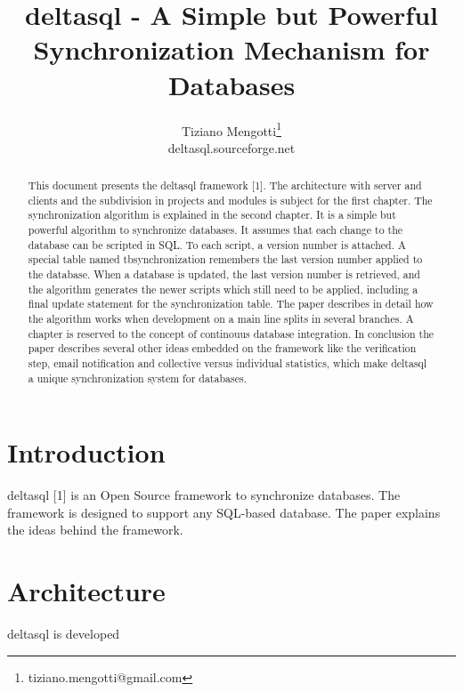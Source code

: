 \documentclass[10pt,a4paper]{article}
\begin{document}
\pagestyle{headings}

\title{deltasql - A Simple but Powerful Synchronization Mechanism for Databases}

\author{Tiziano Mengotti\thanks{tiziano.mengotti@gmail.com}\\
deltasql.sourceforge.net\\}

\maketitle
\thispagestyle{empty}

\begin{abstract}
This document presents the deltasql framework [1]. The architecture with server and clients and the subdivision in projects and modules is subject for the first chapter. 
The synchronization algorithm is explained in the second chapter. It is a simple but powerful algorithm to synchronize databases. It assumes that each change to the database can be scripted in SQL. To each script, a version number is attached. A special table named tbsynchronization remembers the last version number applied to the database. When a database is updated, the last version number is retrieved, and the algorithm generates the newer scripts which still need to be applied, including a final update statement for the synchronization table. The paper describes in detail how the algorithm works when development on a main line splits in several branches. 
A chapter is reserved to the concept of continouus database integration. In conclusion the paper describes several other ideas embedded on the framework like the verification step, email notification and collective versus individual statistics, which make deltasql a unique synchronization system for databases. 
\end{abstract}

\section{Introduction}
\label{sec:intro}
deltasql [1] is an Open Source framework to synchronize databases. The framework is designed to support any SQL-based database. The paper explains the ideas behind the framework.

\section{Architecture}
deltasql is developed 
\end{document}
